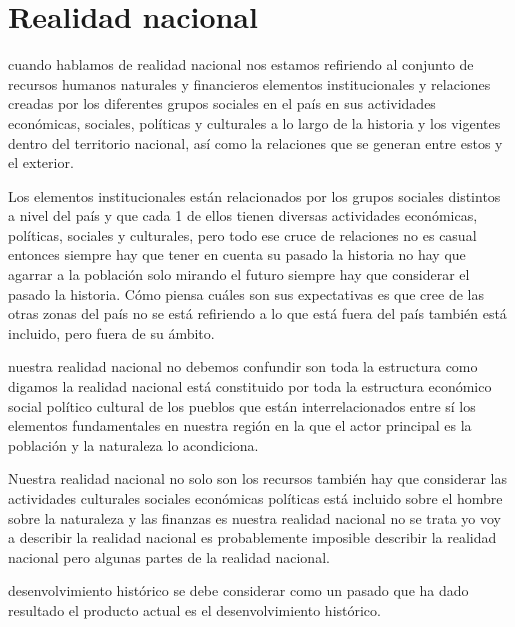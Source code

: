 \documentclass[
  letterpaper,
  DIV=11,
  numbers=noendperiod]{scrartcl}
\begin{document}
\hypertarget{realidad-nacional}{%
\section{Realidad nacional}\label{realidad-nacional}}

cuando hablamos de realidad nacional nos estamos refiriendo al conjunto
de recursos humanos naturales y financieros elementos institucionales y
relaciones creadas por los diferentes grupos sociales en el país en sus
actividades económicas, sociales, políticas y culturales a lo largo de
la historia y los vigentes dentro del territorio nacional, así como la
relaciones que se generan entre estos y el exterior.

Los elementos institucionales están relacionados por los grupos sociales
distintos a nivel del país y que cada 1 de ellos tienen diversas
actividades económicas, políticas, sociales y culturales, pero todo ese
cruce de relaciones no es casual entonces siempre hay que tener en
cuenta su pasado la historia no hay que agarrar a la población solo
mirando el futuro siempre hay que considerar el pasado la historia. Cómo
piensa cuáles son sus expectativas es que cree de las otras zonas del
país no se está refiriendo a lo que está fuera del país también está
incluido, pero fuera de su ámbito.

nuestra realidad nacional no debemos confundir son toda la estructura
como digamos la realidad nacional está constituido por toda la
estructura económico social político cultural de los pueblos que están
interrelacionados entre sí los elementos fundamentales en nuestra región
en la que el actor principal es la población y la naturaleza lo
acondiciona.

Nuestra realidad nacional no solo son los recursos también hay que
considerar las actividades culturales sociales económicas políticas está
incluido sobre el hombre sobre la naturaleza y las finanzas es nuestra
realidad nacional no se trata yo voy a describir la realidad nacional es
probablemente imposible describir la realidad nacional pero algunas
partes de la realidad nacional.

desenvolvimiento histórico se debe considerar como un pasado que ha dado
resultado el producto actual es el desenvolvimiento histórico.


\printbibliography
\end{document}
